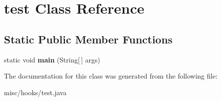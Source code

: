 \hypertarget{classtest}{\section{test Class Reference}
\label{classtest}
}
\subsection*{Static Public Member Functions}
\begin{DoxyCompactItemize}
\item 
\hypertarget{classtest_ad4ba96bceb9e7b2c011c5bf6cbabb965}{static void {\bfseries main} (String\mbox{[}$\,$\mbox{]} args)}\label{classtest_ad4ba96bceb9e7b2c011c5bf6cbabb965}

\end{DoxyCompactItemize}


The documentation for this class was generated from the following file\-:\begin{DoxyCompactItemize}
\item 
misc/hooks/test.\-java\end{DoxyCompactItemize}
